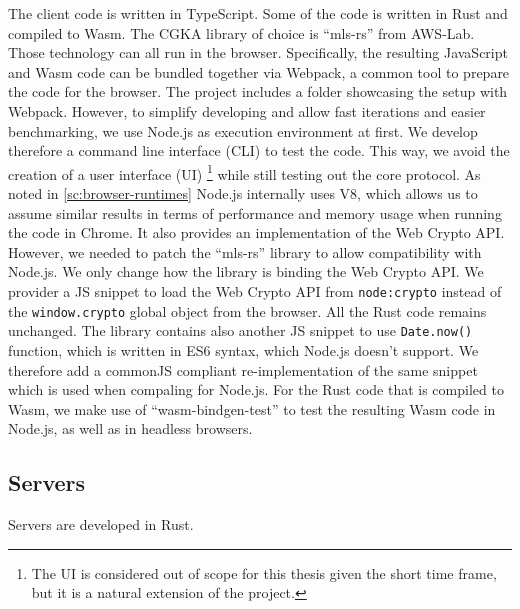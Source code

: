 The client code is written in TypeScript.
Some of the code is written in Rust and compiled to Wasm.
The CGKA library of choice is ``mls-rs'' from AWS-Lab.
Those technology can all run in the browser. Specifically,
the resulting JavaScript and Wasm code can be bundled
together via Webpack, a common tool to prepare
the code for the browser.
The project includes a folder showcasing the setup with
Webpack.
However, to simplify developing and allow fast iterations and easier benchmarking,
we use Node.js as execution environment at first.
We develop therefore a command line interface (CLI) to test the code.
This way, we avoid the creation of a user
interface (UI)
\footnote{The UI is considered out of scope for this thesis given the short time frame, but it is a natural extension of the project.}
while still testing out the core protocol. 
As noted in \cref{sc:browser-runtimes}
Node.js internally uses V8, which allows us to assume
similar results in terms of performance and memory usage
when running the code in Chrome. It also provides
an implementation of the Web Crypto API.
However, we needed to patch the ``mls-rs'' library
to allow compatibility with Node.js.
We only change how the library is binding the Web Crypto API.
We provider a JS snippet to load the Web Crypto API from
\texttt{node:crypto} instead of the \texttt{window.crypto} global
object from the browser. All the Rust code remains
unchanged. The library contains also another JS snippet
to use \texttt{Date.now()} function, which is written in
ES6 syntax, which Node.js doesn't support.
We therefore add a commonJS compliant re-implementation
of the same snippet which is used
when compaling for Node.js.
For the Rust code that is compiled to Wasm, we make use of
``wasm-bindgen-test'' to test the resulting Wasm code in 
Node.js, as well as in headless browsers.


\subsection{Servers}

Servers are developed in Rust.






